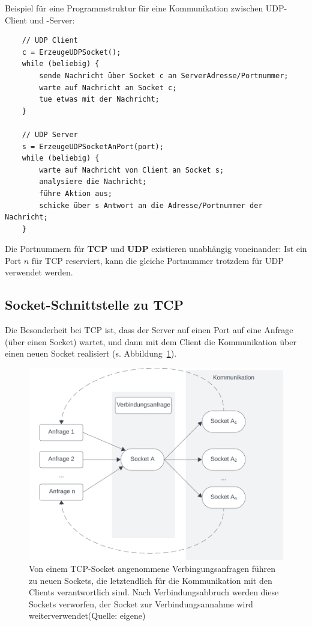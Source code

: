 \newpage
\noindent
Beispiel für eine Programmstruktur für eine Kommunikation zwischen UDP-Client und -Server:
\begin{verbatim}
    // UDP Client
    c = ErzeugeUDPSocket();
    while (beliebig) {
        sende Nachricht über Socket c an ServerAdresse/Portnummer;
        warte auf Nachricht an Socket c;
        tue etwas mit der Nachricht;
    }

    // UDP Server
    s = ErzeugeUDPSocketAnPort(port);
    while (beliebig) {
        warte auf Nachricht von Client an Socket s;
        analysiere die Nachricht;
        führe Aktion aus;
        schicke über s Antwort an die Adresse/Portnummer der Nachricht;
    }
\end{verbatim}

\begin{tcolorbox}[enlarge top by=0.5cm,enlarge bottom by=0.5cm]
    Die Portnummern für \textbf{TCP} und \textbf{UDP} existieren unabhängig voneinander: Ist ein Port $n$ für TCP reserviert, kann die gleiche Portnummer trotzdem für UDP verwendet werden.
\end{tcolorbox}

\subsection{Socket-Schnittstelle zu TCP}

Die Besonderheit bei TCP ist, dass der Server auf einen Port auf eine Anfrage (über einen Socket) wartet, und dann mit dem Client die Kommunikation über einen neuen Socket realisiert (s. Abbildung~\ref{fig:tcpsockets}).\\

\begin{figure}
    \centering
    \includegraphics[scale=0.5]{chapters/fopt5/img/sockets/tcpsockets}
    \caption{Von einem TCP-Socket angenommene Verbingungsanfragen führen zu neuen Sockets, die letztendlich für die Kommunikation mit den Clients verantwortlich sind.
    Nach Verbindungsabbruch werden diese Sockets verworfen, der Socket zur Verbindungsannahme wird weiterverwendet(Quelle: eigene)}
    \label{fig:tcpsockets}
\end{figure}



